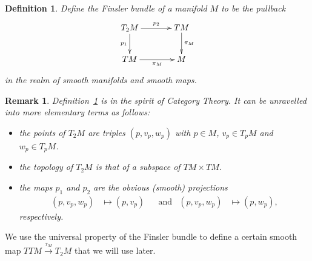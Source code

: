 \documentclass[11pt,a4paper,twoside,openany]{report}
\theoremstyle{my-theorem}
\theoremstyle{non-theorem}
\newtheorem{definition}[theorem]{Definition}
\newtheorem{remark}[theorem]{Remark}
\begin{document}
			\begin{definition}
				\label{def:finsler-bundle}
				Define the \emph{Finsler bundle} of a manifold $M$ to be the pullback
				\begin{align*}
					\xymatrixcolsep{3pc}\xymatrix{
						T_2M \ar[d]_-{p_1} \ar[r]^-{p_2} & TM \ar[d]^-{\pi_M}\\
						TM \ar[r]_-{\pi_M} & M}
				\end{align*}
				in the realm of smooth manifolds and smooth maps.
			\end{definition}
		
			\begin{remark}
				Definition~\ref{def:finsler-bundle} is in the spirit of Category Theory. It can be unravelled into more elementary terms as follows:
				\begin{itemize}
					\item the points of $T_2M$ are triples $(p,v_p,w_p)$ with $p \in M$, $v_p \in T_pM$ and $w_p \in T_pM$.
					
					\item the topology of $T_2M$ is that of a subspace of $TM \times TM$.
					
					\item the maps $p_1$ and $p_2$ are the obvious (smooth) projections
					\begin{align*}
						(p,v_p,w_p) &\mapsto (p,v_p)
					&
						&\text{and}
					&
						(p,v_p,w_p) &\mapsto (p,w_p),
					\end{align*}
					respectively.
				\end{itemize}
			\end{remark}
		
			We use the universal property of the Finsler bundle to define a certain smooth map $TTM \xrightarrow{\tau_M} T_2M$ that we will use later.
			
\end{document}
